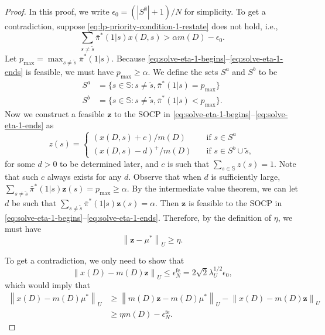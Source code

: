 \documentclass[11pt,letterpaper]{article}
\theoremstyle{plain}
\theoremstyle{definition}
\theoremstyle{remark}
\newcommand{\norm}[1]{\left\lVert#1\right\rVert}
\newcommand{\ve}[1]{\bm{#1}}
\newcommand{\sspa}{\mathbb{S}}
\newcommand{\pibar}{{\sysbar{\pi}}}
\newcommand{\pibs}{{\pibar^*}}
\newcommand{\sysbar}[1]{\bar{#1}}
\newcommand{\sempty}{S^{\emptyset}}
\newcommand{\statdist}{\mu^*}
\newcommand{\umat}{U}
\newcommand{\errfe}{\epsilon_N^{\text{fe}}}
\newcommand{\lamu}{\lambda_\umat}
\newcommand{\sneu}{\tilde{s}}
\begin{document}
\begin{proof}
    In this proof, we write $\epsilon_0 = (|\sempty|+1) / N$ for simplicity. To get a contradiction, suppose \eqref{eq:lp-priority-condition-1-restate} does not hold, i.e.,
    \[
        \sum_{s\neq \sneu} \pibs(1|s) x(D, s) > \alpha m(D) - \epsilon_0.
    \]
    Let $p_{\max} = \max_{s\neq \sneu} \pibs(1|s)$. 
    Because \eqref{eq:solve-eta-1-begins}--\eqref{eq:solve-eta-1-ends} is feasible, we must have $p_{\max} \geq \alpha$. 
    We define the sets $S^a$ and $S^b$ to be
    \begin{align*}
        S^a &= \{s\in\sspa\colon s\neq \sneu, \pibs(1|s) = p_{\max}  \}\\
        S^b &=  \{s\in\sspa \colon s\neq \sneu, \pibs(1|s) < p_{\max}  \}.
    \end{align*}
    Now we construct a feasible $\ve{z}$ to the SOCP in \eqref{eq:solve-eta-1-begins}--\eqref{eq:solve-eta-1-ends} as
    \begin{equation}
        z(s) = 
        \begin{cases}
            (x(D, s) + c) / m(D)  \quad & \text{if } s\in S^a\\
            (x(D, s) - d)^+ / m(D) \quad & \text{if } s\in S^b\cup{\sneu},
        \end{cases}
    \end{equation}
    for some $d > 0$ to be determined later, and $c$ is such that $\sum_{s\in\sspa} z(s) = 1$. Note that such $c$ always exists for any $d$. 
    Observe that when $d$ is sufficiently large, $\sum_{s\neq \sneu} \pibs(1|s) \ve{z}(s) = p_{\max} \geq \alpha$. By the intermediate value theorem, we can let $d$ be such that $\sum_{s\neq \sneu} \pibs(1|s) \ve{z}(s) = \alpha$. Then $\ve{z}$ is feasible to the SOCP in \eqref{eq:solve-eta-1-begins}--\eqref{eq:solve-eta-1-ends}. 
    Therefore, by the definition of $\eta$, we must have 
    \begin{equation}
        \norm{\ve{z} - \statdist}_\umat \geq \eta. 
    \end{equation}

    To get a contradiction, we only need to show that 
    \begin{equation}
        \label{eq:proposition-socp-fe:intermediate-goal}
        \norm{x(D) - m(D)\ve{z}}_\umat \leq \errfe = 2\sqrt{2}\lamu^{1/2} \epsilon_0,
    \end{equation}
    which would imply that 
    \begin{align*}
        \norm{x(D) - m(D)\statdist}_\umat 
        &\geq \norm{m(D)\ve{z} - m(D)\statdist}_\umat - \norm{x(D) - m(D)\ve{z}}_\umat \\
        &\geq \eta m(D) - \errfe.
    \end{align*}


\end{proof}
\end{document}
